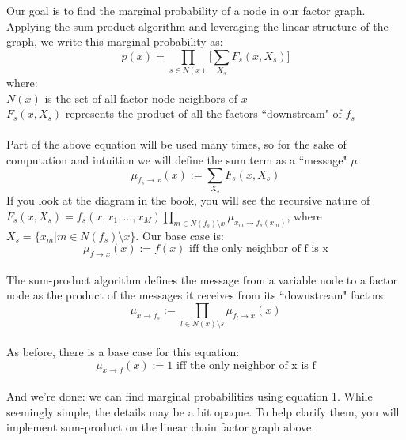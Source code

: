 \documentclass[11pt]{article}
\begin{document}
Our goal is to find the marginal probability of a node in our factor graph.  Applying the sum-product algorithm and leveraging the linear structure of the graph, we write this marginal probability as:
\begin{equation}
\label{eq:sum-product}
	p(x) = \prod_{s \in N(x)} \Bigg[ \sum_{X_s} F_s(x, X_s) \Bigg]
\end{equation}
where:\\
\indent $N(x)$ is the set of all factor node neighbors of $x$\\
\indent $F_s(x, X_s)$ represents the product of all the factors ``downstream" of $f_s$\\
\\
Part of the above equation will be used many times, so for the sake of computation and intuition we will define the sum term as a ``message" $\mu$:
\begin{equation}
\label{eq:f2x}
	\mu_{f_s \rightarrow x}(x) := \sum_{X_s} F_s(x, X_s)
\end{equation}
If you look at the diagram in the book, you will see the recursive nature of $F_s(x, X_s)=f_s(x,x_1,\ldots,x_M) \prod\limits_{m \in N(f_s) \setminus x} \mu_{x_m \rightarrow f_s(x_m)}$, where $X_s=\{x_m|m \in N(f_s) \setminus x\}$. Our base case is:
\[
	\mu_{f \rightarrow x}(x) := f(x) \text{ iff the only neighbor of f is x}
\]
\\
The sum-product algorithm defines the message from a variable node to a factor node as the product of the messages it receives from its ``downstream" factors:
\begin{equation}
	\mu_{x \rightarrow f_s} := \prod_{l \in N(x) \setminus s} \mu_{f_l \rightarrow x}(x)
\end{equation}
\\
As before, there is a base case for this equation:
\[
	\mu_{x \rightarrow f}(x) := 1 \text{ iff the only neighbor of x is f}
\]
\\
And we're done: we can find marginal probabilities using equation 1. While seemingly simple, the details may be a bit opaque. To help clarify them, you will implement sum-product on the linear chain factor graph above.
\end{document}

